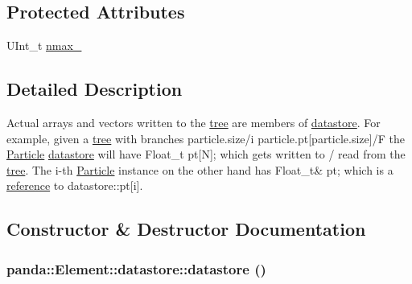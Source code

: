 \subsection*{Protected Attributes}
\begin{DoxyCompactItemize}
\item 
UInt\_\-t \hyperlink{structpanda_1_1Element_1_1datastore_ad34a7e5ccf28ff223cdb4d24f0e97375}{nmax\_\-}
\end{DoxyCompactItemize}


\subsection{Detailed Description}
Actual arrays and vectors written to the \hyperlink{namespacepanda_1_1tree}{tree} are members of \hyperlink{structpanda_1_1Element_1_1datastore}{datastore}. For example, given a \hyperlink{namespacepanda_1_1tree}{tree} with branches particle.size/i particle.pt\mbox{[}particle.size\mbox{]}/F the \hyperlink{classpanda_1_1Particle}{Particle} \hyperlink{structpanda_1_1Element_1_1datastore}{datastore} will have Float\_\-t pt\mbox{[}N\mbox{]}; which gets written to / read from the \hyperlink{namespacepanda_1_1tree}{tree}. The i-\/th \hyperlink{classpanda_1_1Particle}{Particle} instance on the other hand has Float\_\-t\& pt; which is a \hyperlink{namespacepanda_1_1reference}{reference} to datastore::pt\mbox{[}i\mbox{]}. 

\subsection{Constructor \& Destructor Documentation}
\hypertarget{structpanda_1_1Element_1_1datastore_a19506caec8d63f38674506dbb8283495}{
\subsubsection[{datastore}]{\setlength{\rightskip}{0pt plus 5cm}panda::Element::datastore::datastore ()}}
\label{structpanda_1_1Element_1_1datastore_a19506caec8d63f38674506dbb8283495}


